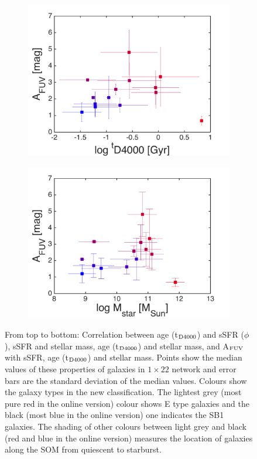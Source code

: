 \begin{figure}
\begin{subfigure}[b]{0.3\textwidth}
            \includegraphics[width=\textwidth]{images0.01/1d/f5.png}
        \end{subfigure}
       \hfill
        \begin{subfigure}[b]{0.3\textwidth}
            \includegraphics[width=\textwidth]{images0.01/1d/f6.png}
        \end{subfigure}
        \caption[Relations between properties of the clustered galaxies]{From top to bottom: Correlation between age (t$_{\rm {D4000}}$) and sSFR ($\phi$), sSFR and stellar mass, age (t$_{\rm {D4000}}$) and stellar mass, and A$_{\rm {FUV}}$ with sSFR, age (t$_{\rm {D4000}}$) and stellar mass. Points show the median values of these properties of galaxies in $1\times22$ network and error bars are the standard deviation of the median values. Colours show the galaxy types in the new classification. The lightest grey (most pure red in the online version) colour shows E type galaxies and the black (most blue in the online version) one indicates the SB1 galaxies. The shading of other colours between light grey and black (red and blue in the online version) measures the location of galaxies along the SOM from  quiescent to starburst.}
        \label{fig: props_vs_props}
        \end{figure}
    
